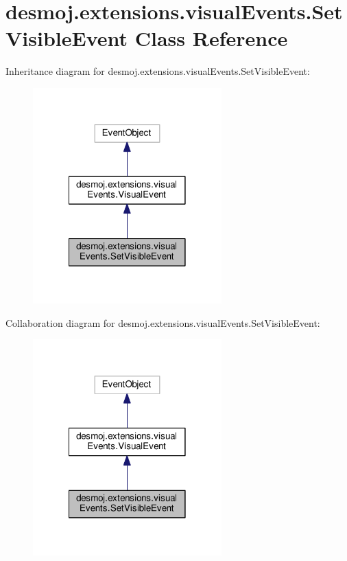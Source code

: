 \section{desmoj.\-extensions.\-visual\-Events.\-Set\-Visible\-Event Class Reference}
\label{classdesmoj_1_1extensions_1_1visual_events_1_1_set_visible_event}


Inheritance diagram for desmoj.\-extensions.\-visual\-Events.\-Set\-Visible\-Event\-:
\nopagebreak
\begin{figure}[H]
\begin{center}
\leavevmode
\includegraphics[width=206pt]{classdesmoj_1_1extensions_1_1visual_events_1_1_set_visible_event__inherit__graph}
\end{center}
\end{figure}


Collaboration diagram for desmoj.\-extensions.\-visual\-Events.\-Set\-Visible\-Event\-:
\nopagebreak
\begin{figure}[H]
\begin{center}
\leavevmode
\includegraphics[width=206pt]{classdesmoj_1_1extensions_1_1visual_events_1_1_set_visible_event__coll__graph}
\end{center}
\end{figure}
